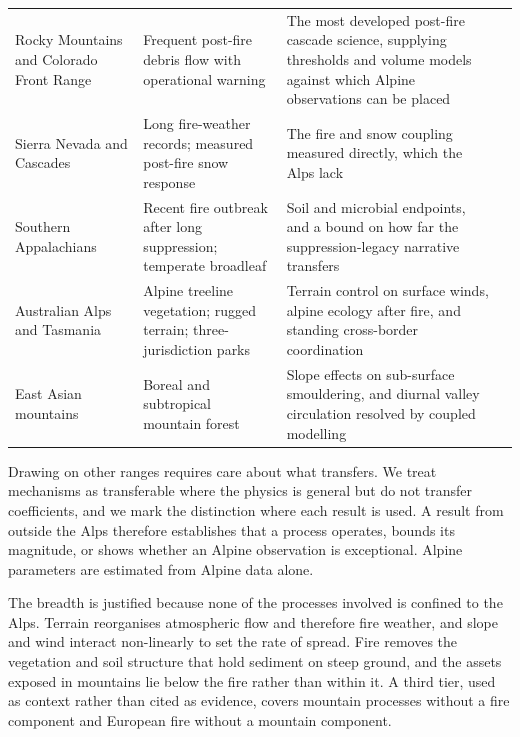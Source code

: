 \documentclass[11pt,a4paper]{article}
\begin{document}
\begin{table}[H]
\begin{tabularx}{\textwidth}{@{}>{\raggedright\arraybackslash}p{2.0cm} >{\raggedright\arraybackslash}p{3.3cm} >{\raggedright\arraybackslash}X >{\raggedright\arraybackslash}p{3.1cm}@{}}
Rocky Mountains and Colorado Front Range & Frequent post-fire debris flow with operational warning & The most developed post-fire cascade science, supplying thresholds and volume models against which Alpine observations can be placed & \citealp{rengers_evaluating_2024, rogeau_effect_2018} \\
Sierra Nevada and Cascades & Long fire-weather records; measured post-fire snow response & The fire and snow coupling measured directly, which the Alps lack & \citealp{micheletty_application_2014, koshkin_wildfire_2022} \\
Southern Appalachians & Recent fire outbreak after long suppression; temperate broadleaf & Soil and microbial endpoints, and a bound on how far the suppression-legacy narrative transfers & \citealp{reilly_drivers_2022, snyder_taxonomic_2026} \\
Australian Alps and Tasmania & Alpine treeline vegetation; rugged terrain; three-jurisdiction parks & Terrain control on surface winds, alpine ecology after fire, and standing cross-border coordination & \citealp{sharples_overview_2009, ozaki_impact_2022, wilson_distribution_2022, lockwood_biodiversity_2014} \\
East Asian mountains & Boreal and subtropical mountain forest & Slope effects on sub-surface smouldering, and diurnal valley circulation resolved by coupled modelling & \citealp{shan_influence_2024, wang_dynamic_2026} \\
\bottomrule
\end{tabularx}
\end{table}

Drawing on other ranges requires care about what transfers. We treat mechanisms as transferable where the physics is general but do not transfer coefficients, and we mark the distinction where each result is used. A result from outside the Alps therefore establishes that a process operates, bounds its magnitude, or shows whether an Alpine observation is exceptional. Alpine parameters are estimated from Alpine data alone.

The breadth is justified because none of the processes involved is confined to the Alps. Terrain reorganises atmospheric flow and therefore fire weather, and slope and wind interact non-linearly to set the rate of spread. Fire removes the vegetation and soil structure that hold sediment on steep ground, and the assets exposed in mountains lie below the fire rather than within it. A third tier, used as context rather than cited as evidence, covers mountain processes without a fire component and European fire without a mountain component.
\end{document}
